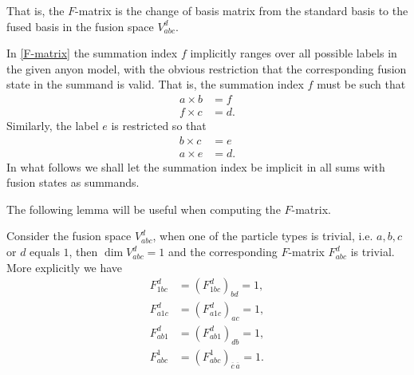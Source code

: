 That is, the $F$-matrix is the change of basis matrix from the standard basis to the fused basis in the fusion space $V_{abc}^d$.

\begin{remark}\label{rem:sum index range}
  In \cref{F-matrix} the summation index $f$ implicitly ranges over all possible labels in the given anyon model, with the obvious restriction that the corresponding fusion state in the summand is valid. That is, the summation index $f$ must be such that
  \begin{equation}
    \begin{aligned}
      a \times b &= f \\
      f \times c &= d.
    \end{aligned}
  \end{equation}
  Similarly, the label $e$ is restricted so that
  \begin{equation}
    \begin{aligned}
      b \times c &= e \\
      a \times e &= d.
    \end{aligned}
  \end{equation}
  In what follows we shall let the summation index be implicit in all sums with fusion states as summands.
\end{remark}

The following lemma will be useful when computing the $F$-matrix.

\begin{lemma}\label{res:F1}
  Consider the fusion space $V_{abc}^d$, when one of the particle types is trivial, i.e. $a,b,c$ or $d$ equals $1$, then $\dim V_{abc}^d = 1$ and the corresponding $F$-matrix $F_{abc}^d$ is trivial. More explicitly we have
  \begin{equation}
    \begin{aligned}
      F_{1bc}^d &= \left( F_{1bc}^d \right)_{bd} = 1, \\
      F_{a1c}^d &= \left( F_{a1c}^d \right)_{ac} = 1, \\
      F_{ab1}^d &= \left( F_{ab1}^d \right)_{db} = 1, \\
      F_{abc}^1 &= \left( F_{abc}^1 \right)_{\overline{c}\,\overline{a}} = 1.
    \end{aligned}
  \end{equation}
\end{lemma}

